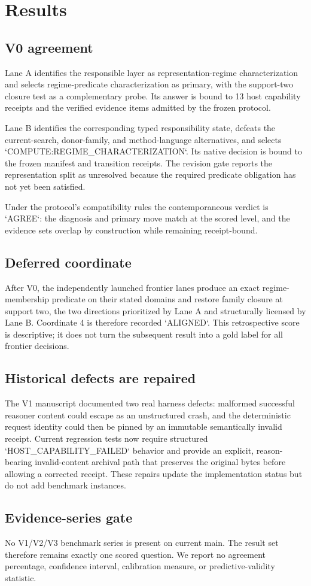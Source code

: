 \section{Results}

\subsection{V0 agreement}
Lane A identifies the responsible layer as representation-regime characterization and selects regime-predicate characterization as primary, with the support-two closure test as a complementary probe. Its answer is bound to 13 host capability receipts and the verified evidence items admitted by the frozen protocol.

Lane B identifies the corresponding typed responsibility state, defeats the current-search, donor-family, and method-language alternatives, and selects `COMPUTE:REGIME_CHARACTERIZATION`. Its native decision is bound to the frozen manifest and transition receipts. The revision gate reports the representation split as unresolved because the required predicate obligation has not yet been satisfied.

Under the protocol's compatibility rules the contemporaneous verdict is `AGREE`: the diagnosis and primary move match at the scored level, and the evidence sets overlap by construction while remaining receipt-bound.

\subsection{Deferred coordinate}
After V0, the independently launched frontier lanes produce an exact regime-membership predicate on their stated domains and restore family closure at support two, the two directions prioritized by Lane A and structurally licensed by Lane B. Coordinate 4 is therefore recorded `ALIGNED`. This retrospective score is descriptive; it does not turn the subsequent result into a gold label for all frontier decisions.

\subsection{Historical defects are repaired}
The V1 manuscript documented two real harness defects: malformed successful reasoner content could escape as an unstructured crash, and the deterministic request identity could then be pinned by an immutable semantically invalid receipt. Current regression tests now require structured `HOST_CAPABILITY_FAILED` behavior and provide an explicit, reason-bearing invalid-content archival path that preserves the original bytes before allowing a corrected receipt. These repairs update the implementation status but do not add benchmark instances.

\subsection{Evidence-series gate}
No V1/V2/V3 benchmark series is present on current main. The result set therefore remains exactly one scored question. We report no agreement percentage, confidence interval, calibration measure, or predictive-validity statistic.